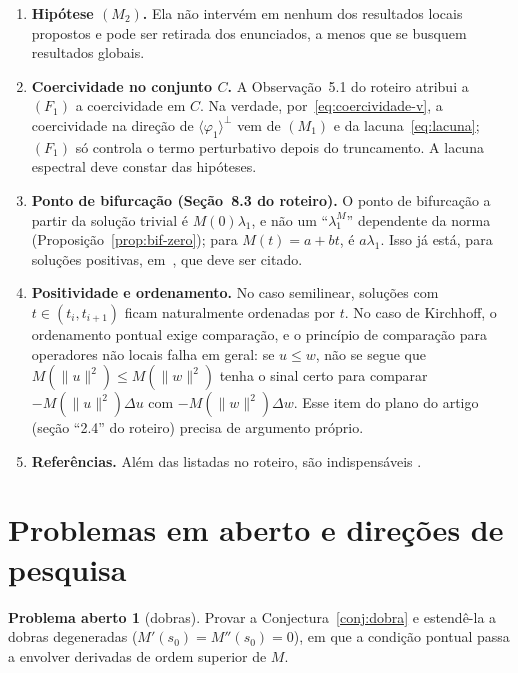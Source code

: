 \documentclass[11pt,a4paper]{article}
\theoremstyle{plain}
\theoremstyle{definition}
\newtheorem{problema}{Problema aberto}
\theoremstyle{remark}
\newcommand{\norm}[1]{\lVert #1\rVert}
\begin{document}
\begin{enumerate}[label=\textbf{(\arabic*)},leftmargin=2.2em]
ressonantes, um para cada $t$, e não como um único valor.
\item \textbf{Hipótese $(M_2)$.} Ela não intervém em nenhum dos resultados
locais propostos e pode ser retirada dos enunciados, a menos que se busquem
resultados globais.
\item \textbf{Coercividade no conjunto $C$.} A Observação~5.1 do roteiro atribui
a $(F_1)$ a coercividade em $C$. Na verdade, por~\eqref{eq:coercividade-v}, a
coercividade na direção de $\langle\varphi_1\rangle^\perp$ vem de $(M_1)$ e da
lacuna~\eqref{eq:lacuna}; $(F_1)$ só controla o termo perturbativo depois do
truncamento. A lacuna espectral deve constar das hipóteses.
\item \textbf{Ponto de bifurcação (Seção~8.3 do roteiro).} O ponto de
bifurcação a partir da solução trivial é $M(0)\lambda_1$, e não um
``$\lambda_1^M$'' dependente da norma
(Proposição~\ref{prop:bif-zero}); para $M(t)=a+bt$, é $a\lambda_1$. Isso já
está, para soluções positivas, em~\cite{AmbrosettiArcoya2017}, que deve ser
citado.
\item \textbf{Positividade e ordenamento.} No caso semilinear, soluções com
$t\in(t_i,t_{i+1})$ ficam naturalmente ordenadas por $t$. No caso de Kirchhoff,
o ordenamento pontual exige comparação, e o princípio de comparação para
operadores não locais falha em geral: se $u\le w$, não se segue que
$M(\norm{u}^2)\le M(\norm{w}^2)$ tenha o sinal certo para comparar
$-M(\norm{u}^2)\Delta u$ com $-M(\norm{w}^2)\Delta w$. Esse item do plano do
artigo (seção ``2.4'' do roteiro) precisa de argumento próprio.
\item \textbf{Referências.} Além das listadas no roteiro, são indispensáveis
\cite{AmbrosettiArcoya2017,SunTang2013,CintraEtAl2020,ArcoyaRezendeSilva2019,ArcoyaGamez2001,Rabinowitz1971,Rabinowitz1973}.
\end{enumerate}

\section{Problemas em aberto e direções de pesquisa}\label{sec:abertos}

\begin{problema}[dobras]
Provar a Conjectura~\ref{conj:dobra} e estendê-la a dobras degeneradas
($M'(s_0)=M''(s_0)=0$), em que a condição pontual passa a envolver derivadas
de ordem superior de $M$.
\end{problema}
\end{document}
